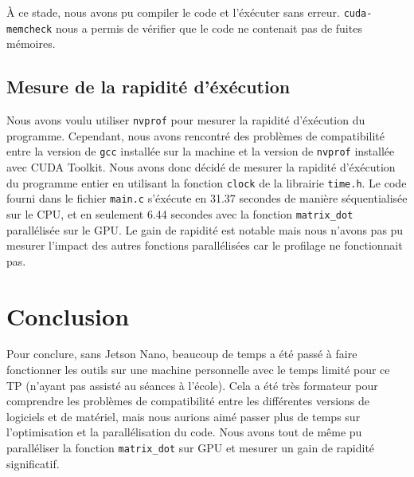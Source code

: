 \documentclass[12pt, a4paper]{article}
\begin{document}
À ce stade, nous avons pu compiler le code et l'éxécuter sans erreur. \texttt{cuda-memcheck} nous a permis de vérifier que le code ne contenait pas de fuites mémoires.

\subsection{Mesure de la rapidité d'éxécution}

Nous avons voulu utiliser \texttt{nvprof} pour mesurer la rapidité d'éxécution du programme. Cependant, nous avons rencontré des problèmes de compatibilité entre la version de \texttt{gcc} installée sur la machine et la version de \texttt{nvprof} installée avec CUDA Toolkit. Nous avons donc décidé de mesurer la rapidité d'éxécution du programme entier en utilisant la fonction \texttt{clock} de la librairie \texttt{time.h}.
Le code fourni dans le fichier \texttt{main.c} s'éxécute en 31.37 secondes de manière séquentialisée sur le CPU, et en seulement 6.44 secondes avec la fonction \texttt{matrix\_dot} parallélisée sur le GPU. Le gain de rapidité est notable mais nous n'avons pas pu mesurer l'impact des autres fonctions parallélisées car le profilage ne fonctionnait pas.

\section{Conclusion}

Pour conclure, sans Jetson Nano, beaucoup de temps a été passé à faire fonctionner les outils sur une machine personnelle avec le temps limité pour ce TP (n'ayant pas assisté au séances à l'école). Cela a été très formateur pour comprendre les problèmes de compatibilité entre les différentes versions de logiciels et de matériel, mais nous aurions aimé passer plus de temps sur l'optimisation et la parallélisation du code. Nous avons tout de même pu paralléliser la fonction \texttt{matrix\_dot} sur GPU et mesurer un gain de rapidité significatif.
\end{document}
